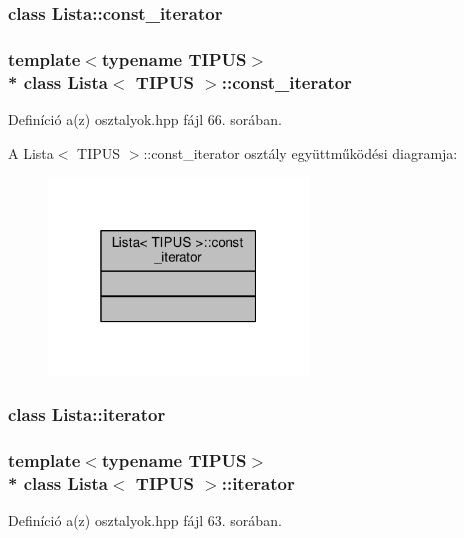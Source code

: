 \subsubsection{class Lista\+:\+:const\+\_\+iterator}
\subsubsection*{template$<$typename T\+I\+P\+US$>$\\*
class Lista$<$ T\+I\+P\+U\+S $>$\+::const\+\_\+iterator}



Definíció a(z) osztalyok.\+hpp fájl 66. sorában.



A Lista$<$ T\+I\+P\+US $>$\+:\+:const\+\_\+iterator osztály együttműködési diagramja\+:\nopagebreak
\begin{figure}[H]
\begin{center}
\leavevmode
\includegraphics[width=196pt]{classLista_1_1const__iterator__coll__graph}
\end{center}
\end{figure}
\label{classLista_1_1iterator}
\hypertarget{classLista_classLista_1_1iterator}{}
\subsubsection{class Lista\+:\+:iterator}
\subsubsection*{template$<$typename T\+I\+P\+US$>$\\*
class Lista$<$ T\+I\+P\+U\+S $>$\+::iterator}



Definíció a(z) osztalyok.\+hpp fájl 63. sorában.



